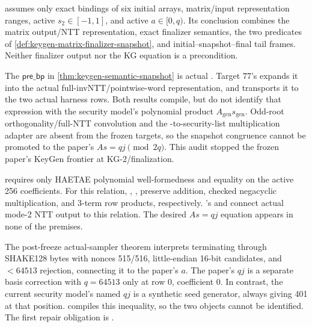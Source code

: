\begin{verified}
\label{thm:keygen-semantic-snapshot}
 assumes only exact
bindings of six initial arrays, matrix/input representation ranges, active
\(s_2\in[-1,1]\), and active \(a\in[0,q)\). Its conclusion combines the matrix
output/NTT representation, exact finalizer semantics, the two predicates of
\cref{def:keygen-matrix-finalizer-snapshot}, and initial--snapshot--final tail
frames. Neither finalizer output nor the KG equation is a precondition.
\end{verified}

\begin{boundary}
\label{bdry:keygen-ntt-mul}
The \(\mathsf{pre\_bp}\) in \cref{thm:keygen-semantic-snapshot} is actual
. Target 77's
 expands it into the actual
full-invNTT/pointwise-word representation, and
 transports it to the two
actual harness rows. Both results compile, but do not identify that expression
with the security model's polynomial product
\(A_{\mathrm{gen}}s_{\mathrm{gen}}\). Odd-root orthogonality/full-NTT convolution
and the -to-security-list multiplication adapter are absent
from the frozen targets, so the snapshot congruence cannot be promoted to the
paper's \(As=qj\pmod{2q}\). This audit stopped the frozen paper's KeyGen frontier
at KG-2/finalization.
\end{boundary}

\begin{verified}
\label{thm:rq-haetae-post-freeze}
 requires only HAETAE polynomial
well-formedness and  equality on the active 256
coefficients. For this relation,
, ,
 preserve addition, checked negacyclic
multiplication, and 3-term row products, respectively.
's  and
 connect actual mode-2 NTT output to
this relation. The desired \(As=qj\) equation appears in none of the premises.
\end{verified}

\begin{boundary}
\label{bdry:keygen-avec-qj}
The post-freeze actual-sampler theorem interprets terminating
 through SHAKE128 bytes with nonces 515/516, little-endian
16-bit candidates, and \(<64513\) rejection, connecting it to the paper's
\(a\). The paper's \(qj\) is a separate basis correction with \(q=64513\) only
at row 0, coefficient 0. In contrast, the current security model's named
\(qj\) is a synthetic seed generator, always giving 401 at that position.
 compiles this inequality, so the
two objects cannot be identified. The first repair obligation is
.
\end{boundary}

